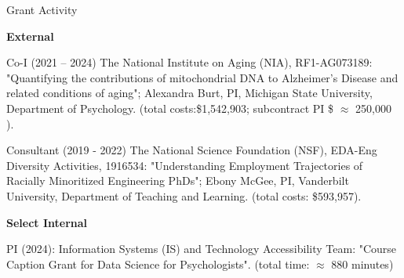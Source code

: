 \begin{rSection}{\textrm{Grant Activity}}%
\begin{etaremune}
{\large \textbf{External}}\\
\item Co-I (2021 – 2024) The National Institute on Aging (NIA), RF1-AG073189: "Quantifying the contributions of mitochondrial DNA to Alzheimer's Disease and related conditions of aging"; Alexandra Burt, PI, Michigan State University, Department of Psychology. (total costs:\$1,542,903; subcontract PI \$ $\approx$ 250,000 ).
\item Consultant (2019 - 2022) The National Science Foundation (NSF), EDA-Eng Diversity Activities, 1916534: "Understanding Employment Trajectories of Racially Minoritized Engineering PhDs"; Ebony McGee, PI, Vanderbilt University, Department of Teaching and Learning. (total costs: \$593,957).

{\large \textbf{Select Internal}}\\
\item PI (2024):  Information Systems (IS) and Technology Accessibility Team: "Course Caption Grant for Data Science for Psychologists". (total time: $\approx$ 880 minutes)
\end{etaremune}

\end{rSection}